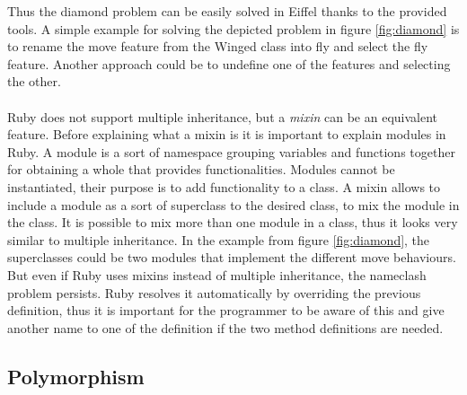 \documentclass[12pt,a4paper,twocolumn]{article}
\begin{document}
Thus the diamond problem can be easily solved in Eiffel thanks to the provided tools. A simple example for solving the depicted problem in figure \ref{fig:diamond} is to rename the move feature from the Winged class into fly and select the fly feature. Another approach could be to undefine one of the features and selecting the other.
\\
\\
Ruby does not support multiple inheritance,  but a \emph{mixin} can be an equivalent feature. Before explaining what a mixin is it is important to explain modules in Ruby. A module is a sort of namespace grouping variables and functions together for obtaining a whole that provides functionalities. Modules cannot be instantiated, their purpose is to add functionality to a class. A mixin allows to include a module as a sort of superclass to the desired class, to mix the module in the class. It is possible to mix more than one module in a class, thus it looks very similar to multiple inheritance. In the example from figure \ref{fig:diamond}, the superclasses could be two modules that implement the different move behaviours. But even if Ruby uses mixins instead of multiple inheritance, the nameclash problem persists. Ruby resolves it automatically by overriding the previous definition, thus it is important for the programmer to be aware of this and give another name to one of the definition if the two method definitions are needed.
\subsection{Polymorphism} %

\end{document}
